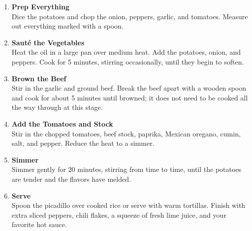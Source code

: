 \begin{enumerate}

      \item \textbf{Prep Everything} \\
            Dice the potatoes and chop the onion, peppers, garlic, and tomatoes. Measure out everything marked with a spoon.

      \item \textbf{Sauté the Vegetables} \\
            Heat the oil in a large pan over medium heat. Add the potatoes, onion, and peppers. Cook for 5 minutes, stirring occasionally, until they begin to soften.

      \item \textbf{Brown the Beef} \\
            Stir in the garlic and ground beef. Break the beef apart with a wooden spoon and cook for about 5 minutes until browned; it does not need to be cooked all the way through at this stage.

      \item \textbf{Add the Tomatoes and Stock} \\
            Stir in the chopped tomatoes, beef stock, paprika, Mexican oregano, cumin, salt, and pepper. Reduce the heat to a simmer.

      \item \textbf{Simmer} \\
            Simmer gently for 20 minutes, stirring from time to time, until the potatoes are tender and the flavors have melded.

      \item \textbf{Serve} \\
            Spoon the picadillo over cooked rice or serve with warm tortillas. Finish with extra sliced peppers, chili flakes, a squeeze of fresh lime juice, and your favorite hot sauce.

\end{enumerate}

